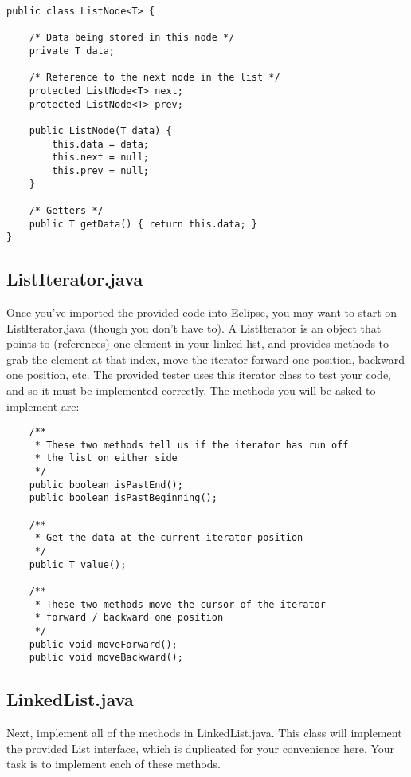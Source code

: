 \documentclass[paper=a4, fontsize=11pt, parskip=full]{scrartcl} %
\numberwithin{equation}{section} %
\numberwithin{figure}{section} %
\numberwithin{table}{section} %
\begin{document}
\begin{lstlisting}
public class ListNode<T> {
	
	/* Data being stored in this node */
	private T data;
	
	/* Reference to the next node in the list */
	protected ListNode<T> next;
	protected ListNode<T> prev;
	
	public ListNode(T data) {
		this.data = data;
		this.next = null;
		this.prev = null;
	}
	
	/* Getters */
	public T getData() { return this.data; }
}
\end{lstlisting}

\subsection{ListIterator.java}

Once you've imported the provided code into Eclipse, you may want to start on ListIterator.java (though you don't have to). A ListIterator is an object that points to (references) one element in your linked list, and provides methods to grab the element at that index, move the iterator forward one position, backward one position, etc. The provided tester uses this iterator class to test your code, and so it must be implemented correctly. The methods you will be asked to implement are:

\begin{lstlisting}
	/**
	 * These two methods tell us if the iterator has run off
	 * the list on either side
	 */
	public boolean isPastEnd();
	public boolean isPastBeginning();

	/**
	 * Get the data at the current iterator position
	 */
	public T value();

	/**
	 * These two methods move the cursor of the iterator
	 * forward / backward one position
	 */
	public void moveForward();
	public void moveBackward();
\end{lstlisting}

\subsection{LinkedList.java}

Next, implement all of the methods in LinkedList.java. This class will implement the provided List interface, which is duplicated for your convenience here. Your task is to implement each of these methods.
\end{document}
